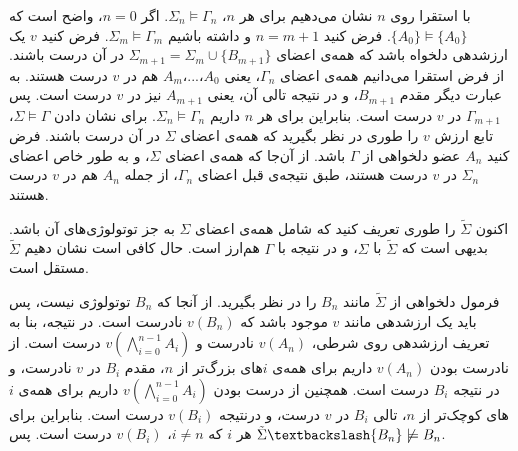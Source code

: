 \begin{ans}
\begin{enumerate}
    با استقرا روی $n$ نشان می‌دهیم برای هر $n$، $\Sigma_n \models \Gamma_n$.
    اگر $n=0$، واضح است که $\{A_0\} \models \{A_0\}$. فرض کنید $n=m+1$ و داشته باشیم $\Sigma_m \models \Gamma_m$. فرض کنید $v$ یک ارزشدهی دلخواه باشد که همه‌ی اعضای $\Sigma_{m+1} = \Sigma_m \cup \{ B_{m+1} \}$ در آن درست باشند. از فرض استقرا می‌دانیم همه‌ی اعضای $\Gamma_n$، یعنی $A_0$،...،$A_m$ هم در $v$ درست هستند. به عبارت دیگر مقدم $B_{m+1}$، و در نتیجه تالی آن، یعنی $A_{m+1}$ نیز در $v$ درست است. پس $\Gamma_{m+1}$ در $v$ درست است. بنابراین برای هر $n$ داریم $\Sigma_n \models \Gamma_n$. برای نشان دادن $\Sigma \models \Gamma$، تابع ارزش $v$ را طوری در نظر بگیرید که همه‌ی اعضای $\Sigma$ در آن درست باشند. فرض کنید $A_n$ عضو دلخواهی از $\Gamma$ باشد. از آن‌جا که همه‌ی اعضای $\Sigma$، و به طور خاص اعضای $\Sigma_n$ در $v$ درست هستند، طبق نتیجه‌ی قبل اعضای $\Gamma_n$، از جمله $A_n$ هم در $v$ درست هستند.

    اکنون $\tilde{\Sigma}$ را طوری تعریف کنید که شامل همه‌ی اعضای $\Sigma$ به جز توتولوژی‌های آن باشد. بدیهی است که $\tilde{\Sigma}$ با $\Sigma$، و در نتیجه با $\Gamma$ هم‌ارز است. حال کافی است نشان دهیم $\tilde{\Sigma}$ مستقل است.

    فرمول دلخواهی از $\tilde{\Sigma}$ مانند $B_n$ را در نظر بگیرید. از آنجا که $B_n$ توتولوژی نیست، پس باید یک ارزشدهی مانند $v$ موجود باشد که $v(B_n)$ نادرست است. در نتیجه، بنا به تعریف ارزشدهی روی شرطی، $v(A_n)$ نادرست و $v(\bigwedge_{i=0}^{n-1} A_i)$ درست است. از نادرست بودن $v(A_n)$ داریم برای همه‌ی $i$های بزرگ‌تر از $n$، مقدم $B_i$ در $v$ نادرست، و در نتیجه $B_i$ درست است. همچنین از درست بودن $v(\bigwedge_{i=0}^{n-1} A_i)$ داریم برای همه‌ی $i$های کوچک‌تر از $n$، تالی $B_i$ در $v$ درست، و درنتیجه $v(B_i)$ درست است. بنابراین برای هر $i$ که $i \neq n$، $v(B_i)$ درست است. پس $\tilde{\Sigma}\textbackslash\{B_n\} \not\models B_n$.

  \end{enumerate}
\end{ans}